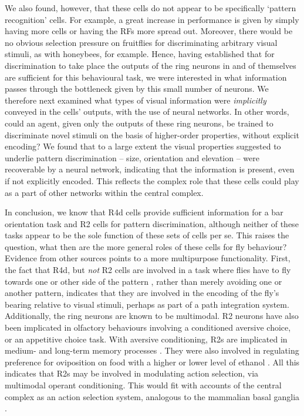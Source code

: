 We also found, however, that these cells do not appear to be specifically `pattern recognition' cells.
For example, a great increase in performance is given by simply having more cells or having the RFs more spread out.
Moreover, there would be no obvious selection pressure on fruitflies for discriminating arbitrary visual stimuli, as with honeybees, for example.
Hence, having established that for discrimination to take place the outputs of the ring neurons in and of themselves are sufficient for this behavioural task, we were interested in what information passes through the bottleneck given by this small number of neurons.
We therefore next examined what types of visual information were \emph{implicitly} conveyed in the cells' outputs, with the use of neural networks.
In other words, could an agent, given only the outputs of these ring neurons, be trained to discriminate novel stimuli on the basis of higher-order properties, without explicit encoding?
We found that to a large extent the visual properties suggested to underlie pattern discrimination -- size, orientation and elevation -- were recoverable by a neural network, indicating that the information is present, even if not explicitly encoded.
This reflects the complex role that these cells could play as a part of other networks within the central complex.

In conclusion, we know that R4d cells provide sufficient information for a bar orientation task and R2 cells for pattern discrimination, although neither of these tasks appear to be the sole function of these sets of cells per se.
This raises the question, what then are the more general roles of these cells for fly behaviour?
Evidence from other sources points to a more multipurpose functionality.
First, the fact that R4d, but \emph{not} R2 cells are involved in a task where flies have to fly towards one or other side of the pattern \cite{Guo2015}, rather than merely avoiding one or another pattern, indicates that they are involved in the encoding of the fly's bearing relative to visual stimuli, perhaps as part of a path integration system.
Additionally, the ring neurons are known to be multimodal.
R2 neurons have also been implicated in olfactory behaviours involving a conditioned aversive choice, or an appetitive choice task.
With aversive conditioning, R2s are implicated in medium- and long-term memory processes \cite{Zhang2013,Zhang2015}.
They were also involved in regulating preference for oviposition on food with a higher or lower level of ethanol \cite{Azanchi2013}.
All this indicates that R2s may be involved in modulating action selection, via multimodal operant conditioning.
This would fit with accounts of the central complex as an action selection system, analogous to the mammalian basal ganglia \cite{Strausfeld2013}.

